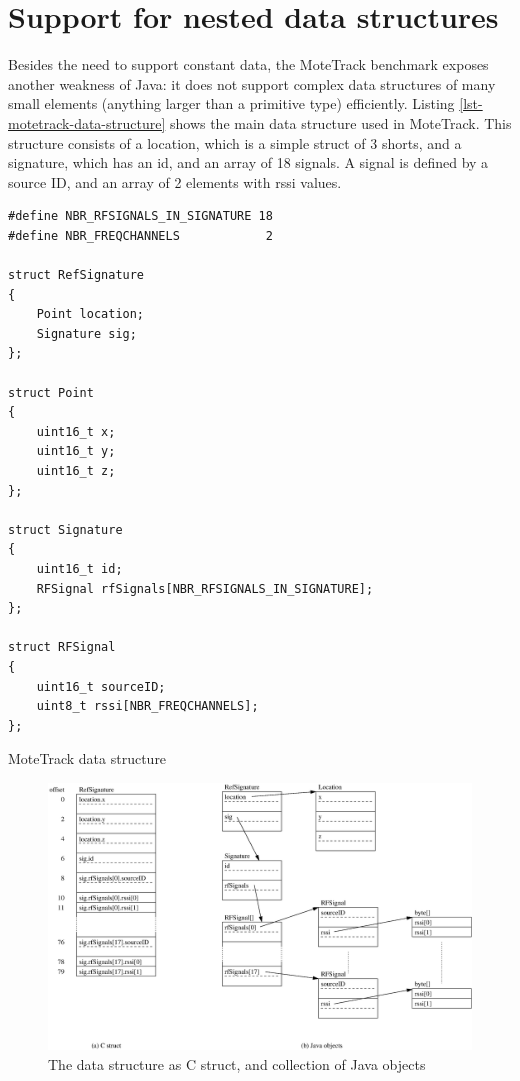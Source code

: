 \section{Support for nested data structures}
\label{sec-nested-data}
Besides the need to support constant data, the MoteTrack benchmark exposes another weakness of Java: it does not support complex data structures of many small elements (anything larger than a primitive type) efficiently. Listing \ref{lst-motetrack-data-structure} shows the main  data structure used in MoteTrack. This structure consists of a location, which is a simple struct of 3 shorts, and a signature, which has an id, and an array of 18 signals. A signal is defined by a source ID, and an array of 2 elements with rssi values.

\begin{listing}[H]
\small
\centering
\begin{verbatim}
#define NBR_RFSIGNALS_IN_SIGNATURE 18
#define NBR_FREQCHANNELS            2

struct RefSignature
{
    Point location;
    Signature sig;
};

struct Point
{
    uint16_t x;
    uint16_t y;
    uint16_t z;
};

struct Signature
{
    uint16_t id;
    RFSignal rfSignals[NBR_RFSIGNALS_IN_SIGNATURE];
};

struct RFSignal
{
    uint16_t sourceID;
    uint8_t rssi[NBR_FREQCHANNELS];
};
\end{verbatim}
\caption{MoteTrack  data structure}
\label{lst-motetrack-data-structure}
\end{listing}

\begin{figure}[]
  \centering
  \includegraphics[width=0.9\linewidth]{motetrack-refsignature-objects}
  \caption{The  data structure as C struct, and collection of Java objects}
  \label{fig-motetrack-refsignature-objects}
\end{figure}

